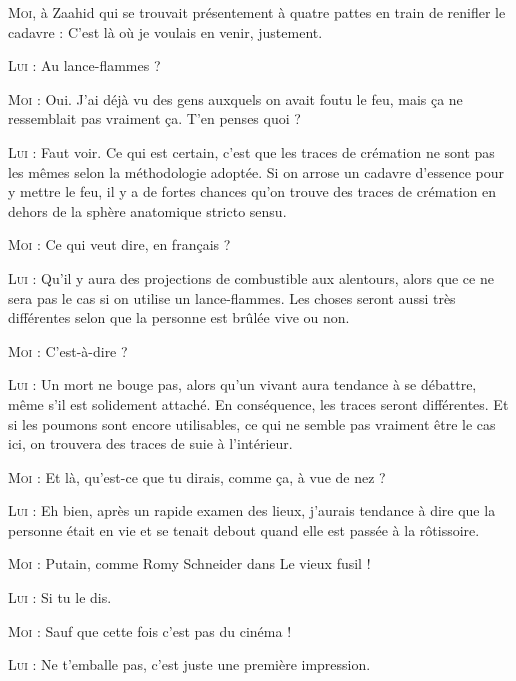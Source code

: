 \begin{dialogue}

\textsc{Moi}, à Zaahid qui se trouvait présentement à quatre pattes en train de renifler le cadavre : C’est là où je voulais en venir, justement.

\textsc{Lui} : Au lance-flammes ?

\textsc{Moi} : Oui. J’ai déjà vu des gens auxquels on avait foutu le feu, mais ça ne ressemblait pas vraiment ça. T’en penses quoi ?

\textsc{Lui} : Faut voir. Ce qui est certain, c’est que les traces de crémation ne sont pas les mêmes selon la méthodologie adoptée. Si on arrose un cadavre d’essence pour y mettre le feu, il y a de fortes chances qu’on trouve des traces de crémation en dehors de la sphère anatomique stricto sensu.

\textsc{Moi} : Ce qui veut dire, en français ?

\textsc{Lui} : Qu’il y aura des projections de combustible aux alentours, alors que ce ne sera pas le cas si on utilise un lance-flammes. Les choses seront aussi très différentes selon que la personne est brûlée vive ou non.

\textsc{Moi} : C’est-à-dire ?

\textsc{Lui} : Un mort ne bouge pas, alors qu’un vivant aura tendance à se débattre, même s’il est solidement attaché. En conséquence, les traces seront différentes. Et si les poumons sont encore utilisables, ce qui ne semble pas vraiment être le cas ici, on trouvera des traces de suie à l’intérieur.

\textsc{Moi} : Et là, qu’est-ce que tu dirais, comme ça, à vue de nez ?

\textsc{Lui} : Eh bien, après un rapide examen des lieux, j’aurais tendance à dire que la personne était en vie et se tenait debout quand elle est passée à la rôtissoire.

\textsc{Moi} : Putain, comme Romy Schneider dans Le vieux fusil !

\textsc{Lui} : Si tu le dis.

\textsc{Moi} : Sauf que cette fois c’est pas du cinéma !

\textsc{Lui} : Ne t’emballe pas, c’est juste une première impression.


\end{dialogue}
